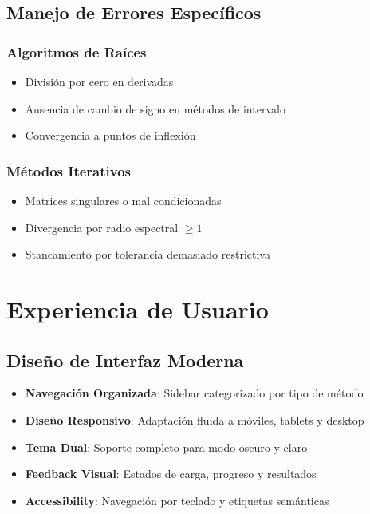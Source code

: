 \subsection{Manejo de Errores Específicos}

\subsubsection{Algoritmos de Raíces}
\begin{itemize}
    \item División por cero en derivadas
    \item Ausencia de cambio de signo en métodos de intervalo
    \item Convergencia a puntos de inflexión
\end{itemize}

\subsubsection{Métodos Iterativos}
\begin{itemize}
    \item Matrices singulares o mal condicionadas
    \item Divergencia por radio espectral $\geq 1$
    \item Stancamiento por tolerancia demasiado restrictiva
\end{itemize}

\section{Experiencia de Usuario}

\subsection{Diseño de Interfaz Moderna}

\begin{itemize}
    \item \textbf{Navegación Organizada}: Sidebar categorizado por tipo de método
    \item \textbf{Diseño Responsivo}: Adaptación fluida a móviles, tablets y desktop
    \item \textbf{Tema Dual}: Soporte completo para modo oscuro y claro
    \item \textbf{Feedback Visual}: Estados de carga, progreso y resultados
    \item \textbf{Accessibility}: Navegación por teclado y etiquetas semánticas
\end{itemize}

